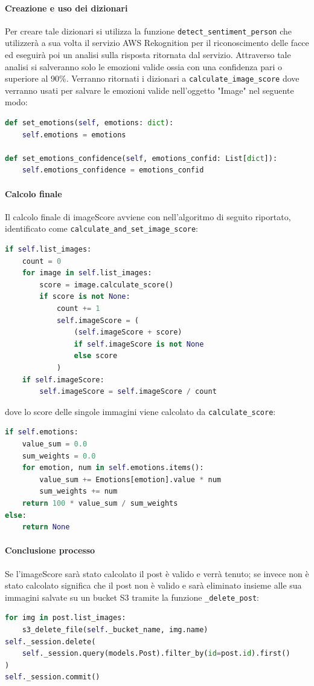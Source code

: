 \paragraph{Creazione e uso dei dizionari} \aCapo{}
Per creare tale dizionari si utilizza la funzione \verb+detect_sentiment_person+ che utilizzerà a sua volta il servizio AWS Rekognition per il riconoscimento delle facce ed eseguirà poi un analisi sulla risposta ritornata dal servizio. Attraverso tale analisi si salveranno solo le emozioni valide ossia con una confidenza pari o superiore al 90\%. Verranno ritornati i dizionari a \verb+calculate_image_score+ dove verranno usati per salvare le emozioni valide nell'oggetto "Image" nel seguente modo:
\begin{lstlisting}[language=Python]
def set_emotions(self, emotions: dict):
    self.emotions = emotions

def set_emotions_confidence(self, emotions_confid: List[dict]):
    self.emotions_confidence = emotions_confid
\end{lstlisting}
\paragraph{Calcolo finale} \aCapo{}
Il calcolo finale di imageScore avviene con nell'algoritmo di seguito riportato, identificato come \verb+calculate_and_set_image_score+: 
\begin{lstlisting}[language=Python]
if self.list_images:
    count = 0
    for image in self.list_images:
        score = image.calculate_score()
        if score is not None:
            count += 1
            self.imageScore = (
                (self.imageScore + score)
                if self.imageScore is not None
                else score
            )
    if self.imageScore:
        self.imageScore = self.imageScore / count
\end{lstlisting}
dove lo score delle singole immagini viene calcolato da \verb+calculate_score+:
\begin{lstlisting}[language=Python]
if self.emotions:
    value_sum = 0.0
    sum_weights = 0.0
    for emotion, num in self.emotions.items():
        value_sum += Emotions[emotion].value * num
        sum_weights += num
    return 100 * value_sum / sum_weights
else:
    return None
\end{lstlisting}
\paragraph{Conclusione processo} \aCapo{}
Se l'imageScore sarà stato calcolato il post è valido e verrà tenuto; se invece non è stato calcolato significa che il post non è valido e sarà eliminato insieme alle sua immagini salvate su un bucket S3 tramite la funzione \verb+_delete_post+:
\begin{lstlisting}[language=Python]
for img in post.list_images:
    s3_delete_file(self._bucket_name, img.name)
self._session.delete(
    self._session.query(models.Post).filter_by(id=post.id).first()
)
self._session.commit()
\end{lstlisting}
